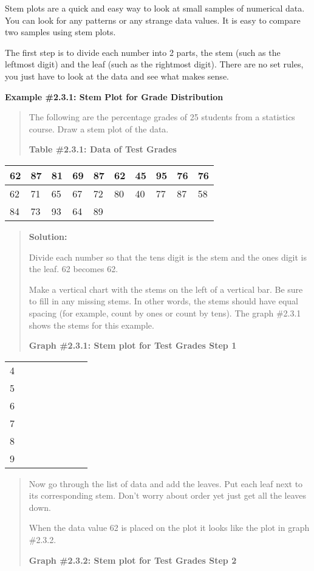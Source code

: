 \documentclass[]{book}
\begin{document}
Stem plots are a quick and easy way to look at small samples of numerical data. You can look for any patterns or any strange data values. It is easy to compare two samples using stem plots.

The first step is to divide each number into 2 parts, the stem (such as the leftmost digit) and the leaf (such as the rightmost digit). There are no set rules, you just have to look at the data and see what makes sense.

\textbf{Example \#2.3.1: Stem Plot for Grade Distribution}

\begin{quote}
The following are the percentage grades of 25 students from a
statistics course. Draw a stem plot of the data.

\textbf{Table \#2.3.1: Data of Test Grades}
\end{quote}

\begin{longtable}[]{@{}llllllllll@{}}
\toprule
62 & 87 & 81 & 69 & 87 & 62 & 45 & 95 & 76 & 76\tabularnewline
\midrule
\endhead
62 & 71 & 65 & 67 & 72 & 80 & 40 & 77 & 87 & 58\tabularnewline
84 & 73 & 93 & 64 & 89 & & & & &\tabularnewline
\bottomrule
\end{longtable}

\begin{quote}
\textbf{Solution:}

Divide each number so that the tens digit is the stem and the ones
digit is the leaf. 62 becomes 6\textbar{}2.

Make a vertical chart with the stems on the left of a vertical bar. Be
sure to fill in any missing stems. In other words, the stems should
have equal spacing (for example, count by ones or count by tens). The
graph \#2.3.1 shows the stems for this example.

\textbf{Graph \#2.3.1: Stem plot for Test Grades Step 1}
\end{quote}

\begin{longtable}[]{@{}llllllll@{}}
\toprule
\endhead
4 & & & & & & &\tabularnewline
5 & & & & & & &\tabularnewline
6 & & & & & & &\tabularnewline
7 & & & & & & &\tabularnewline
8 & & & & & & &\tabularnewline
9 & & & & & & &\tabularnewline
\bottomrule
\end{longtable}

\begin{quote}
Now go through the list of data and add the leaves. Put each leaf next
to its corresponding stem. Don't worry about order yet just get all
the leaves down.

When the data value 62 is placed on the plot it looks like the plot in
graph \#2.3.2.

\textbf{Graph \#2.3.2: Stem plot for Test Grades Step 2}
\end{quote}
\end{document}
